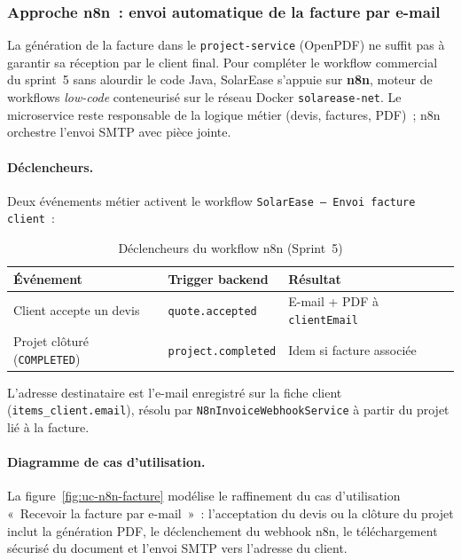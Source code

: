 \subsubsection{Approche n8n~: envoi automatique de la facture par e-mail}
\label{sec:n8n}

La génération de la facture dans le \texttt{project-service} (OpenPDF) ne
suffit pas à garantir sa réception par le client final. Pour compléter le
workflow commercial du sprint~5 sans alourdir le code Java, SolarEase
s'appuie sur \textbf{n8n}, moteur de workflows \textit{low-code} conteneurisé
sur le réseau Docker \texttt{solarease-net}. Le microservice reste responsable
de la logique métier (devis, factures, PDF)~; n8n orchestre l'envoi SMTP avec
pièce jointe.

\paragraph{Déclencheurs.}
Deux événements métier activent le workflow
\texttt{SolarEase --- Envoi facture client}~:

\begin{table}[H]
  \caption{Déclencheurs du workflow n8n (Sprint~5)}
  \label{tab:n8n-triggers}
  \centering\small
  \begin{tabularx}{\textwidth}{|L{4.5cm}|L{3.2cm}|X|}
    \hline
    \textbf{Événement} & \textbf{Trigger backend} & \textbf{Résultat} \\
    \hline
    Client accepte un devis &
    \texttt{quote.accepted} &
    E-mail + PDF à \texttt{clientEmail} \\
    \hline
    Projet clôturé (\texttt{COMPLETED}) &
    \texttt{project.completed} &
    Idem si facture associée \\
    \hline
  \end{tabularx}
\end{table}

L'adresse destinataire est l'e-mail enregistré sur la fiche client
(\texttt{items\_client.email}), résolu par \texttt{N8nInvoiceWebhookService}
à partir du projet lié à la facture.

\paragraph{Diagramme de cas d'utilisation.}
La figure~\ref{fig:uc-n8n-facture} modélise le raffinement du cas d'utilisation
«~Recevoir la facture par e-mail~»~: l'acceptation du devis ou la clôture du
projet inclut la génération PDF, le déclenchement du webhook n8n, le
téléchargement sécurisé du document et l'envoi SMTP vers l'adresse du client.


